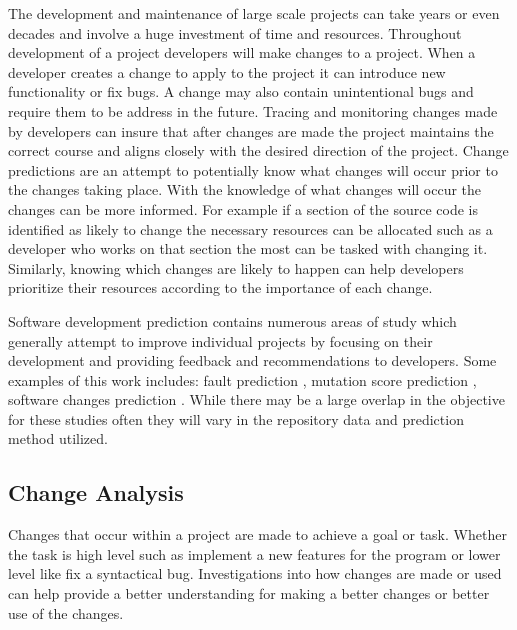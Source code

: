 The development and maintenance of large scale projects can take years or even decades and involve a huge investment of time and resources. Throughout development of a project developers will make changes to a project. When a developer creates a change to apply to the project it can introduce new functionality or fix bugs. A change may also contain unintentional bugs and require them to be address in the future. Tracing and monitoring changes made by developers can insure that after changes are made the project maintains the correct course and aligns closely with the desired direction of the project. Change predictions are an attempt to potentially know what changes will occur prior to the changes taking place. With the knowledge of what changes will occur the changes can be more informed. For example if a section of the source code is identified as likely to change the necessary resources can be allocated such as a developer who works on that section the most can be tasked with changing it. Similarly, knowing which changes are likely to happen can help developers prioritize their resources according to the importance of each change.

Software development prediction contains numerous areas of study which generally attempt to improve individual projects by focusing on their development and providing feedback and recommendations to developers. Some examples of this work includes: fault prediction \cite{Nagappan2007, Moser2008, Thwin2005, Sisman2012}, mutation score prediction \cite{Jalbert2012}, software changes prediction \cite{Bantelay2013, Chaturvedi2014, Giger2012, Hassan2004, Kagdi2007, Ying2004}. While there may be a large overlap in the objective for these studies often they will vary in the repository data and prediction method utilized.

\subsection{Change Analysis}

Changes that occur within a project are made to achieve a goal or task. Whether the task is high level such as implement a new features for the program or lower level like fix a syntactical bug. Investigations into how changes are made or used can help provide a better understanding for making a better changes or better use of the changes.

